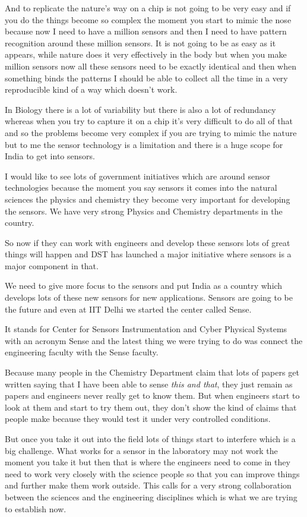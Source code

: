 And to replicate the nature’s way on a chip is not going to be very easy and if you do the things become so complex the moment you start to mimic the nose because now I need to have a million sensors and then I need to have pattern recognition around these million sensors. It is not going to be as easy as it appears, while nature does it very effectively in the body but when you make million sensors now all these sensors need to be exactly identical and then when something binds the patterns I should be able to collect all the time in a very reproducible kind of a way which doesn’t work.

In Biology there is a lot of variability but there is also a lot of redundancy whereas when you try to capture it on a chip it’s very difficult to do all of that and so the problems become very complex if you are trying to mimic the nature but to me the sensor technology is a limitation and there is a huge scope for India to get into sensors.

I would like to see lots of government initiatives which are around sensor technologies because the moment you say sensors it comes into the natural sciences the physics and chemistry they become very important for developing the sensors. We have very strong Physics and Chemistry departments in the country.

So now if they can work with engineers and develop these sensors lots of great things will happen and DST has launched a major initiative where sensors is a major component in that.

We need to give more focus to the sensors and put India as a country which develops lots of these new sensors for new applications.  Sensors are going to be the future and even at IIT Delhi we started the center called Sense. 

It stands for Center for Sensors Instrumentation and Cyber Physical Systems with an acronym Sense and the latest thing we were trying to do was connect the engineering faculty with the Sense faculty.

Because many people in the Chemistry Department claim that lots of papers get written saying that I have been able to sense \textit{this and that}, they just remain as papers and engineers never really get to know them. But when engineers start to look at them and start to try them out, they don’t show the kind of claims that people make because they would test it under very controlled conditions.

But once you take it out into the field lots of things start to interfere which is a big challenge. What works for a sensor in the laboratory may not work the moment you take it but then that is where the engineers need to come in they need to work very closely with the science people so that you can improve things and further make them work outside. This calls for a very strong collaboration between the sciences and the engineering disciplines which is what we are trying to establish now.

